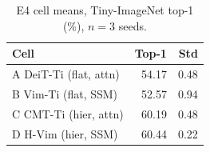 \begin{table}[tbp]
\centering
\caption{E4 cell means, Tiny-ImageNet top-1 (\%), $n=3$ seeds.}
\label{tab:e4cells}
\begin{tabular}{lrr}
\toprule
Cell & Top-1 & Std \\
\midrule
A DeiT-Ti (flat, attn) & 54.17 & 0.48 \\
B Vim-Ti (flat, SSM) & 52.57 & 0.94 \\
C CMT-Ti (hier, attn) & 60.19 & 0.48 \\
D H-Vim (hier, SSM) & 60.44 & 0.22 \\
\bottomrule
\end{tabular}
\end{table}
